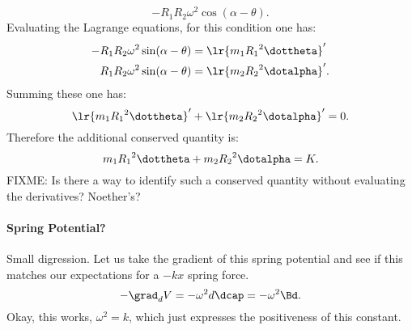 {\begin{equation}
- R_1 R_2 \omega^2 \cos(\alpha - \theta).
\end{equation}
%
Evaluating the Lagrange equations, for this condition one has:
%
\begin{equation}\label{eqn:tongMf1:840}
\begin{aligned}
-R_1 R_2 \omega^2 \sin(\alpha - \theta) &=
\lr{ m_1 {R_1}^2 \dottheta }' \\
R_1 R_2 \omega^2 \sin(\alpha - \theta) &=
\lr{ m_2 {R_2}^2 \dotalpha }'.
\end{aligned}
\end{equation}
%
Summing these one has:
\begin{equation}\label{eqn:tongMf1:2220}
\lr{ m_1 {R_1}^2 \dottheta }'
 + \lr{ m_2 {R_2}^2 \dotalpha }' = 0.
\end{equation}
%
Therefore the additional conserved quantity is:
\begin{equation}\label{eqn:tongMf1:2240}
m_1 {R_1}^2 \dottheta + m_2 {R_2}^2 \dotalpha = K.
\end{equation}
%
FIXME: Is there a way to identify such a conserved quantity without evaluating the derivatives?  Noether's?
%
\paragraph{Spring Potential?}
%
Small digression.  Let us take the gradient of this spring potential and see if this matches our expectations for a \(-kx\) spring force.
%
\begin{equation}\label{eqn:tongMf1:2260}
-{\grad}_d V = -\omega^2 d \dcap = -\omega^2 \Bd.
\end{equation}
%
Okay, this works, \(\omega^2 = k\), which just expresses the positiveness of this constant.
}
%

